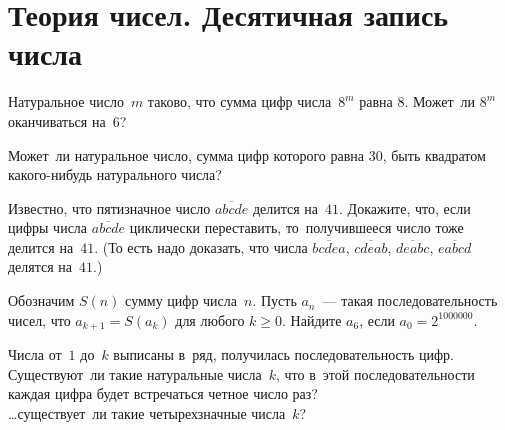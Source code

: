 
\section*{Теория чисел. Десятичная запись числа}


\begin{problems}


\item
Натуральное число~$m$ таково, что сумма цифр числа~$8^m$ равна $8$.
Может~ли $8^m$ оканчиваться на~$6$?

\item
Может~ли натуральное число, сумма цифр которого равна $30$, быть квадратом
какого-нибудь натурального числа?

\item
Известно, что пятизначное число $\overline{abcde}$ делится на~$41$.
Докажите, что, если цифры числа $\overline{abcde}$ циклически переставить,
то~получившееся число тоже делится на~$41$.
(То есть надо доказать, что числа $\overline{bcdea}$, $\overline{cdeab}$,
$\overline{deabc}$, $\overline{eabcd}$ делятся на~$41$.)

\item
Обозначим $S(n)$ сумму цифр числа~$n$.
Пусть $a_n$~--- такая последовательность чисел, что $a_{k+1} = S(a_{k})$ для
любого $k \geq 0$.
Найдите $a_6$, если $a_0 = 2^{1000000}$.

\item
Числа от~$1$ до~$k$ выписаны в~ряд, получилась последовательность цифр.
\\
\subproblem \label{number-theory/digits:problem:5a}
Существуют~ли такие натуральные числа~$k$, что в~этой последовательности каждая
цифра будет встречаться четное число раз?
\\
\subproblem
\ldots существует~ли такие четырехзначные числа~$k$?



\end{problems}
